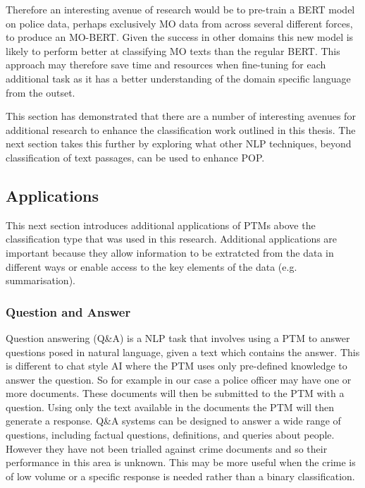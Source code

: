 Therefore an interesting avenue of research would be to pre-train a BERT model on police data, perhaps exclusively MO data from across several different forces, to produce an MO-BERT. Given the success in other domains this new model is likely to perform better at classifying MO texts than the regular BERT. This approach may therefore save time and resources when fine-tuning for each additional task as it has a better understanding of the domain specific language from the outset.

This section has demonstrated that there are a number of interesting avenues for additional research to enhance the classification work outlined in this thesis. The next section takes this further by exploring what other NLP techniques, beyond classification of text passages, can be used to enhance POP. 

\subsection{Applications} This next section introduces additional applications of PTMs above the classification type that was used in this research. Additional applications are important because they allow information to be extratcted from the data in different ways or enable access to the key elements of the data (e.g. summarisation).

\subsubsection{Question and Answer} Question answering (Q\&A) is a NLP task that involves using a PTM to answer questions posed in natural language, given a text which contains the answer. This is different to chat style AI where the PTM uses only pre-defined knowledge to answer the question. So for example in our case a police officer may have one or more documents. These documents will then be submitted to the PTM with a question. Using only the text available in the documents the PTM will then generate a response. Q\&A systems can be designed to answer a wide range of questions, including factual questions, definitions, and queries about people. However they have not been trialled against crime documents and so their performance in this area is unknown. This may be more useful when the crime is of low volume or a specific response is needed rather than a binary classification.

